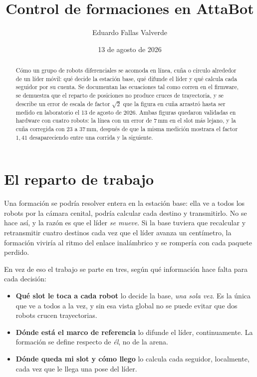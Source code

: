\documentclass[11pt,a4paper]{article}
\title{\bfseries Control de formaciones en AttaBot}
\author{Eduardo Fallas Valverde}
\date{13 de agosto de 2026}
\theoremstyle{plain}
\begin{document}
\maketitle

\begin{abstract}
\noindent
Cómo un grupo de robots diferenciales se acomoda en línea, cuña o círculo
alrededor de un líder móvil: qué decide la estación base, qué difunde el líder
y qué calcula cada seguidor por su cuenta. Se documentan las ecuaciones tal
como corren en el firmware, se demuestra que el reparto de posiciones no
produce cruces de trayectoria, y se describe un error de escala de factor
$\sqrt{2}$ que la figura en cuña arrastró hasta ser medido en laboratorio el
13 de agosto de 2026. Ambas figuras quedaron validadas en hardware con cuatro
robots: la línea con un error de 7\,mm en el slot más lejano, y la cuña
corregida con 23 a 37\,mm, después de que la misma medición mostrara el factor
$1{,}41$ desapareciendo entre una corrida y la siguiente.
\end{abstract}

\tableofcontents
\bigskip

\section{El reparto de trabajo}

Una formación se podría resolver entera en la estación base: ella ve a todos
los robots por la cámara cenital, podría calcular cada destino y transmitirlo.
No se hace así, y la razón es que el líder \emph{se mueve}. Si la base tuviera
que recalcular y retransmitir cuatro destinos cada vez que el líder avanza un
centímetro, la formación viviría al ritmo del enlace inalámbrico y se rompería
con cada paquete perdido.

En vez de eso el trabajo se parte en tres, según qué información hace falta
para cada decisión:

\begin{itemize}
  \item \textbf{Qué slot le toca a cada robot} lo decide la base, \emph{una
    sola vez}. Es la única que ve a todos a la vez, y sin esa vista global no
    se puede evitar que dos robots crucen trayectorias.
  \item \textbf{Dónde está el marco de referencia} lo difunde el líder,
    continuamente. La formación se define respecto de \emph{él}, no de la
    arena.
  \item \textbf{Dónde queda mi slot y cómo llego} lo calcula cada seguidor,
    localmente, cada vez que le llega una pose del líder.
\end{itemize}
\end{document}
